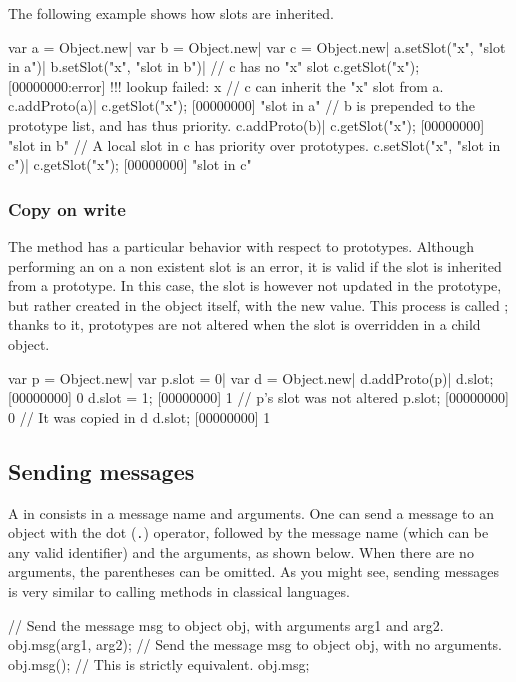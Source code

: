 The following example shows how slots are inherited.

\begin{urbiscript}[firstnumber=1]
var a = Object.new|
var b = Object.new|
var c = Object.new|
a.setSlot("x", "slot in a")|
b.setSlot("x", "slot in b")|
// c has no "x" slot
c.getSlot("x");
[00000000:error] !!! lookup failed: x
// c can inherit the "x" slot from a.
c.addProto(a)|
c.getSlot("x");
[00000000] "slot in a"
// b is prepended to the prototype list, and has thus priority.
c.addProto(b)|
c.getSlot("x");
[00000000] "slot in b"
// A local slot in c has priority over prototypes.
c.setSlot("x", "slot in c")|
c.getSlot("x");
[00000000] "slot in c"
\end{urbiscript}

\subsubsection{Copy on write}

The  method has a particular behavior with
respect to prototypes. Although performing an 
on a non existent slot is an error, it is valid if the slot is inherited
from a prototype. In this case, the slot is however not updated in the
prototype, but rather created in the object itself, with the new value. This
process is called ; thanks to it, prototypes are not
altered when the slot is overridden in a child object.

\begin{urbiscript}
var p = Object.new|
var p.slot = 0|
var d = Object.new|
d.addProto(p)|
d.slot;
[00000000] 0
d.slot = 1;
[00000000] 1
// p's slot was not altered
p.slot;
[00000000] 0
// It was copied in d
d.slot;
[00000000] 1
\end{urbiscript}

\subsection{Sending messages}

A  in \us consists in a message name and arguments. One can
send a message to an object with the dot (\lstinline|.|) operator, followed
by the message name (which can be any valid identifier) and the arguments,
as shown below. When there are no arguments, the parentheses can be
omitted. As you might see, sending messages is very similar to calling
methods in classical languages.

\begin{urbiunchecked}
// Send the message msg to object obj, with arguments arg1 and arg2.
obj.msg(arg1, arg2);
// Send the message msg to object obj, with no arguments.
obj.msg();
// This is strictly equivalent.
obj.msg;
\end{urbiunchecked}

